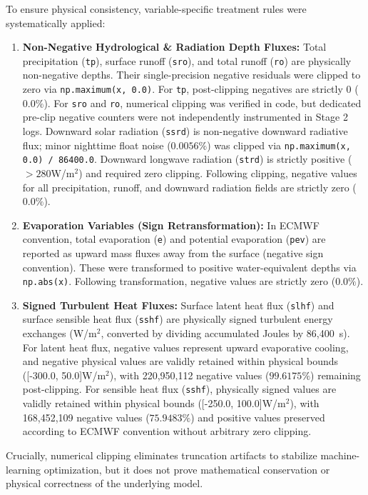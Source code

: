 \documentclass[pdflatex,sn-mathphys,Numbered]{sn-jnl}
\begin{document}
To ensure physical consistency, variable-specific treatment rules were systematically applied:
\begin{enumerate}
    \item \textbf{Non-Negative Hydrological \& Radiation Depth Fluxes:} Total precipitation (\texttt{tp}), surface runoff (\texttt{sro}), and total runoff (\texttt{ro}) are physically non-negative depths. Their single-precision negative residuals were clipped to zero via \texttt{np.maximum(x, 0.0)}. For \texttt{tp}, post-clipping negatives are strictly 0 ($0.0\%$). For \texttt{sro} and \texttt{ro}, numerical clipping was verified in code, but dedicated pre-clip negative counters were not independently instrumented in Stage 2 logs. Downward solar radiation (\texttt{ssrd}) is non-negative downward radiative flux; minor nighttime float noise ($0.0056\%$) was clipped via \texttt{np.maximum(x, 0.0) / 86400.0}. Downward longwave radiation (\texttt{strd}) is strictly positive ($>280$\;W/m$^2$) and required zero clipping. Following clipping, negative values for all precipitation, runoff, and downward radiation fields are strictly zero ($0.0\%$).
    \item \textbf{Evaporation Variables (Sign Retransformation):} In ECMWF convention, total evaporation (\texttt{e}) and potential evaporation (\texttt{pev}) are reported as upward mass fluxes away from the surface (negative sign convention). These were transformed to positive water-equivalent depths via \texttt{np.abs(x)}. Following transformation, negative values are strictly zero ($0.0\%$).
    \item \textbf{Signed Turbulent Heat Fluxes:} Surface latent heat flux (\texttt{slhf}) and surface sensible heat flux (\texttt{sshf}) are physically signed turbulent energy exchanges (W/m$^2$, converted by dividing accumulated Joules by 86,400~s). For latent heat flux, negative values represent upward evaporative cooling, and negative physical values are validly retained within physical bounds ([-300.0, 50.0]\;W/m$^2$), with 220,950,112 negative values ($99.6175\%$) remaining post-clipping. For sensible heat flux (\texttt{sshf}), physically signed values are validly retained within physical bounds ([-250.0, 100.0]\;W/m$^2$), with 168,452,109 negative values ($75.9483\%$) and positive values preserved according to ECMWF convention without arbitrary zero clipping.
\end{enumerate}
Crucially, numerical clipping eliminates truncation artifacts to stabilize machine-learning optimization, but it does not prove mathematical conservation or physical correctness of the underlying model.
\end{document}
